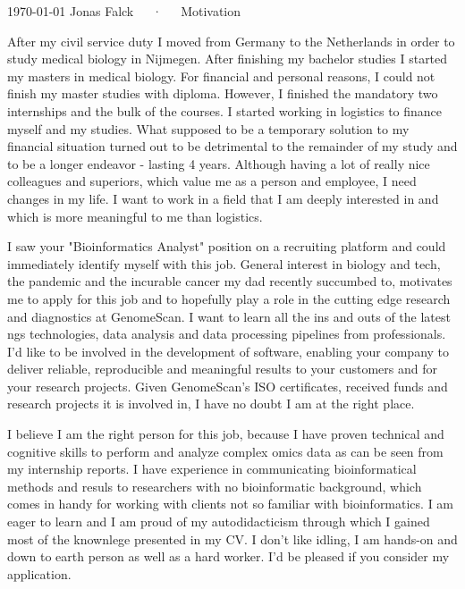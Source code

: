\documentclass[11pt, a4paper]{awesome-cv}
\begin{document}
\makecvheader[R]

\makecvfooter
  {\today}
  {Jonas Falck~~~·~~~Motivation}
  {}

\makelettertitle

\begin{cvletter}

After my civil service duty I moved from Germany to the Netherlands in order to study medical biology in Nijmegen. After finishing my bachelor studies I started my masters in medical biology.
For financial and personal reasons, I could not finish my master studies with diploma.
However, I finished the mandatory two internships and the bulk of the courses.
I started working in logistics to finance myself and my studies.
What supposed to be a temporary solution to my financial situation turned out to be detrimental to the remainder of my study and to be a longer endeavor - lasting 4 years.
Although having a lot of really nice colleagues and superiors, which value me as a person and employee, I need changes in my life.
I want to work in a field that I am deeply interested in and which is more meaningful to me than logistics.

I saw your "Bioinformatics Analyst" position on a recruiting platform and could immediately identify myself with this job. 
General interest in biology and tech, the pandemic and the incurable cancer my dad recently succumbed to, motivates me to apply for this job and to hopefully play a role in the cutting edge research and diagnostics at GenomeScan.
I want to learn all the ins and outs of the latest ngs technologies, data analysis and data processing pipelines from professionals. 
I'd like to be involved in the development of software, enabling your company to deliver reliable, reproducible and meaningful results to your customers and for your research projects.
Given GenomeScan's ISO certificates, received funds and research projects it is involved in, I have no doubt I am at the right place.

I believe I am the right person for this job, because I have proven technical and cognitive skills to perform and analyze complex omics data as can be seen from my internship reports.
I have experience in communicating bioinformatical methods and resuls to researchers with no bioinformatic background, which comes in handy for working with clients not so familiar with bioinformatics. 
I am eager to learn and I am proud of my autodidacticism through which I gained most of the knownlege presented in my CV.
I don't like idling, I am hands-on and down to earth person as well as a hard worker.
I'd be pleased if you consider my application.

\end{cvletter}


\makeletterclosing
\end{document}
